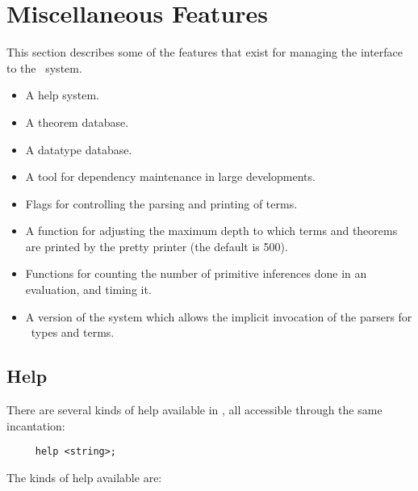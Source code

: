 \chapter{Miscellaneous Features}\label{avramisc}

\newcommand\holmake{\texttt{Holmake}}

This section describes some of the features
that exist for managing the interface to the \HOL\ system.

\begin{itemize}
\item A help system.
\item A theorem database.
\item A datatype database.
\item A tool for dependency maintenance in large developments.
\item Flags for controlling the parsing and printing of terms.
\item A function for adjusting the maximum depth to which terms and
theorems are printed by the pretty printer (the default is 500).
\item Functions for counting the number of primitive inferences done in
an evaluation, and timing it.
\item A version of the system which allows the implicit invocation of
the parsers for \HOL\ types and terms.
\end{itemize}

\section{Help}

 There are several kinds of help available in \holn{}, all accessible
 through the same incantation:
 \begin{verbatim}
     help <string>;
 \end{verbatim}

 The kinds of help available are:

